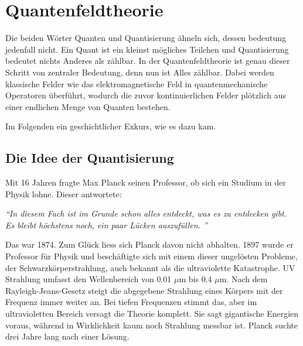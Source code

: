 %
%
%
%
\section{Quantenfeldtheorie\label{fourier:section:quantenfeldtheorie}}
Die beiden Wörter Quanten und Quantisierung ähneln sich, dessen bedeutung jedenfall nicht. 
Ein Quant ist ein kleinst mögliches Teilchen und Quantisierung bedeutet nichts Anderes als zählbar. 
In der Quantenfeldtheorie ist genau dieser Schritt von zentraler Bedeutung, denn nun ist Alles zählbar. 
Dabei werden klassische Felder wie das elektromagnetische Feld in quantenmechanische Operatoren überführt, wodurch die zuvor kontinuierlichen Felder plötzlich aus einer endlichen Menge von Quanten bestehen.

Im Folgenden ein geschichtlicher Exkurs, wie es dazu kam. 



\subsection{Die Idee der Quantisierung\label{fourier:subsection:DieIdeeDerQuantisierung}}
	Mit 16 Jahren fragte Max Planck seinen Professor, ob sich ein Studium in der Physik lohne. 
	Dieser antwortete:
	
	\begin{center}
		\textit{``{}In diesem Fach ist im Grunde schon alles entdeckt, was es zu entdecken gibt.\\
			Es bleibt höchstens noch, ein paar Lücken auszufüllen. ''}
	\end{center}
	
	Das war 1874. 
	Zum Glück liess sich Planck davon nicht abhalten.
	1897 wurde er Professor für Physik und beschäftigte sich mit einem dieser ungelösten Probleme, der Schwarzkörperstrahlung, auch bekannt als die ultraviolette Katastrophe. 
	UV Strahlung umfasst den Wellenbereich von 0.01 $\mu$m bis 0.4 $\mu$m.
	Nach dem Rayleigh-Jeans-Gesetz steigt die abgegebene Strahlung eines Körpers mit der Frequenz immer weiter an. Bei tiefen Frequenzen stimmt das, aber im ultravioletten Bereich versagt die Theorie komplett. 
	Sie sagt gigantische Energien voraus, während in Wirklichkeit kaum noch Strahlung messbar ist.
	Planck suchte drei Jahre lang nach einer Lösung. 
	
